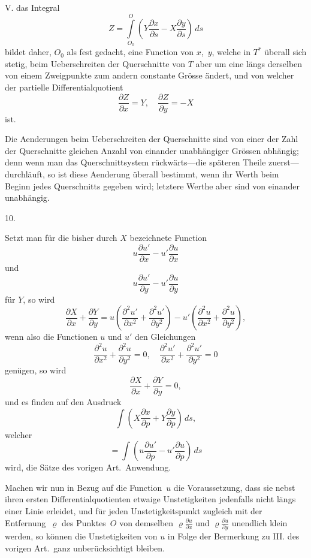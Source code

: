 \documentclass[a4paper,12pt]{article}
\begin{document}
V.  das Integral
\[ Z = \int\limits_{O_0}^O \left(
            Y \frac{\partial x}{\partial s}
          - X \frac{\partial y}{\partial s}
         \right) \, ds \]
bildet daher, $O_0$ als fest gedacht, eine Function von $x$,~$y$,
welche in $T^*$ \"{u}berall sich stetig, beim Ueberschreiten der
Querschnitte von $T$ aber um eine l\"{a}ngs derselben von einem
Zweigpunkte zum andern constante Gr\"{o}sse \"{a}ndert, und von
welcher der partielle Differentialquotient
\[ \frac{\partial Z}{\partial x} = Y,\quad
   \frac{\partial Z}{\partial y} = - X \]
ist.

Die Aenderungen beim Ueberschreiten der Querschnitte sind von
einer der Zahl der Querschnitte gleichen Anzahl von einander
unabh\"{a}ngiger Gr\"{o}ssen abh\"{a}ngig; denn wenn man das
Querschnittsystem r\"{u}ckw\"{a}rts---die sp\"{a}teren Theile
zuerst---durchl\"{a}uft, so ist diese Aenderung \"{u}berall
bestimmt, wenn ihr Werth beim Beginn jedes Querschnitts gegeben
wird; letztere Werthe aber sind von einander unabh\"{a}ngig.

\medbreak

\centerline{10.}

\nobreak\medskip

Setzt man f\"{u}r die bisher durch $X$ bezeichnete Function
\[ u \frac{\partial u'}{\partial x}
   - u' \frac{\partial u}{\partial x} \]
und
\[ u \frac{\partial u'}{\partial y}
   - u' \frac{\partial u}{\partial y} \]
f\"{u}r $Y$, so wird
\[ \frac{\partial X}{\partial x} + \frac{\partial Y}{\partial y}
  =   u  \left(
            \frac{\partial^2 u'}{\partial x^2}
          + \frac{\partial^2 u'}{\partial y^2}
         \right)
    - u' \left(
            \frac{\partial^2 u }{\partial x^2}
          + \frac{\partial^2 u }{\partial y^2}
         \right),\]
wenn also die Functionen $u$ und $u'$ den Gleichungen
\[ \frac{\partial^2 u }{\partial x^2} + \frac{\partial^2 u }{\partial y^2}
      = 0,\quad
   \frac{\partial^2 u'}{\partial x^2} + \frac{\partial^2 u'}{\partial y^2}
      = 0 \]
gen\"{u}gen, so wird
\[ \frac{\partial X}{\partial x} + \frac{\partial Y}{\partial y}
   = 0,\]
und es finden auf den Ausdruck
\[ \int  \left(
            X \frac{\partial x}{\partial p}
          + Y \frac{\partial y}{\partial p}
         \right) \, ds,\]
welcher
\[ = \int \left(
            u  \frac{\partial u'}{\partial p}
          - u' \frac{\partial u }{\partial p}
         \right) \, ds \]
wird, die S\"{a}tze des vorigen Art.\ Anwendung.

Machen wir nun in Bezug auf die Function~$u$ die Voraussetzung,
dass sie nebst ihren ersten Differentialquotienten etwaige
Unstetigkeiten jedenfalls nicht l\"{a}ngs einer Linie erleidet,
und f\"{u}r jeden Unstetigkeitspunkt zugleich mit der
Entfernung~$\varrho$ des Punktes~$O$ von demselben
$\displaystyle \varrho \frac{\partial u}{\partial x}$
und
$\displaystyle \varrho \frac{\partial u}{\partial y}$
unendlich klein werden, so k\"{o}nnen die Unstetigkeiten von $u$
in Folge der Bermerkung zu III. des vorigen Art.\ ganz
unber\"{u}cksichtigt bleiben.
\end{document}
